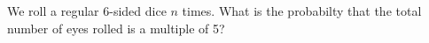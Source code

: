 We roll a regular 6-sided dice \(n\) times. What is the probabilty that the total number of eyes rolled is a multiple of 5?